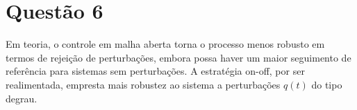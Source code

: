 \documentclass[11pt]{article}
\begin{document}
\section{Questão 6}
Em teoria, o controle em malha aberta torna o processo menos robusto em termos de rejeição de perturbações,
embora possa haver um maior seguimento de referência para sistemas sem perturbações.
A estratégia on-off, por ser realimentada, empresta mais robustez ao sistema a perturbações $q(t)$ do tipo degrau.
\end{document}
